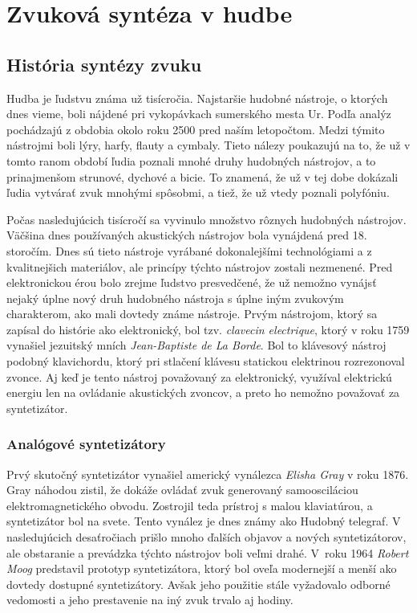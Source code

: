 \chapter{Zvuková syntéza v hudbe}

\section{História syntézy zvuku}
Hudba je ľudstvu známa už tisícročia. Najstaršie hudobné nástroje, o ktorých dnes vieme, boli nájdené pri vykopávkach sumerského mesta Ur. Podľa analýz pochádzajú z obdobia okolo roku 2500 pred naším letopočtom. Medzi týmito nástrojmi boli lýry, harfy, flauty a cymbaly. Tieto nálezy poukazujú na to, že už v tomto ranom období ľudia poznali mnohé druhy hudobných nástrojov, a to prinajmenšom strunové, dychové a bicie. To znamená, že už v tej dobe dokázali ľudia vytvárať zvuk mnohými spôsobmi, a tiež, že už vtedy poznali polyfóniu.

Počas nasledujúcich tisícročí sa vyvinulo množstvo rôznych hudobných nástrojov. Väčšina dnes používaných akustických nástrojov bola vynájdená pred 18. storočím. Dnes sú tieto nástroje vyrábané dokonalejšími technológiami a z kvalitnejšich materiálov, ale princípy týchto nástrojov zostali nezmenené.
Pred elektronickou érou bolo zrejme ľudstvo presvedčené, že už nemožno vynájsť nejaký úplne nový druh hudobného nástroja s úplne iným zvukovým charakterom, ako mali dovtedy známe nástroje.
Prvým nástrojom, ktorý sa zapísal do histórie ako \bq elektronický\eq , bol tzv. \emph{clavecin electrique}, ktorý v roku 1759 vynašiel jezuitský mních \emph{Jean-Baptiste de La Borde}. Bol to klávesový nástroj podobný klavichordu, ktorý pri stlačení klávesu statickou elektrinou rozrezonoval zvonce. Aj keď je tento nástroj považovaný za elektronický, využíval elektrickú energiu len na ovládanie akustických zvoncov, a preto ho nemožno považovať za syntetizátor.

\subsection{Analógové syntetizátory}
Prvý skutočný syntetizátor vynašiel americký vynálezca \emph{Elisha Gray} v roku 1876. Gray náhodou zistil, že dokáže ovládať zvuk generovaný samoosciláciou elektromagnetického obvodu. Zostrojil teda prístroj s malou klaviatúrou, a syntetizátor bol na svete. Tento vynález je dnes známy ako \bq Hudobný telegraf\eq . V nasledujúcich desaťročiach prišlo mnoho ďalších objavov a nových syntetizátorov, ale obstaranie a prevádzka týchto nástrojov boli veľmi drahé. V~roku 1964 \emph{Robert Moog} predstavil prototyp syntetizátora, ktorý bol oveľa modernejší a menší ako dovtedy dostupné syntetizátory. Avšak jeho použitie stále vyžadovalo odborné vedomosti a jeho prestavenie na iný zvuk trvalo aj hodiny.

